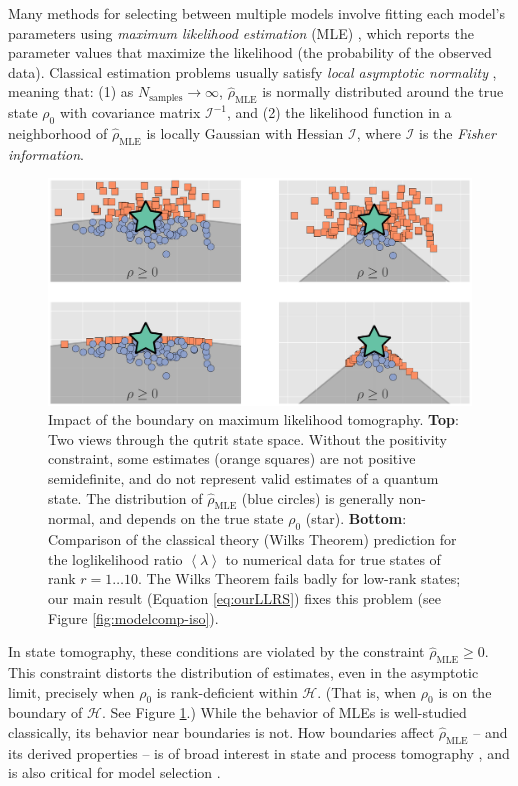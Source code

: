 \documentclass[aps,pra, twocolumn]{revtex4}
\newcommand{\cH}{\mathcal{H}}
\newcommand{\expect}[1]{\ensuremath{\left\langle#1\right\rangle}}
\newcommand{\Fi}{\mathcal{I}}
\newcommand{\rhohat}{\hat{\rho}}
\newcommand{\rhoMLE}{\rhohat_{\scriptscriptstyle\mathrm{MLE}}}
\begin{document}
Many methods for selecting between multiple models involve fitting each model's parameters using \emph{maximum likelihood estimation} (MLE) \cite{Hradil1997, JamesPRA2001, Blume-Kohout2010}, which reports the parameter values that maximize the likelihood (the probability of the observed data). Classical estimation problems usually satisfy \emph{local asymptotic normality} \cite{LeCam1970, LeCam1956}, meaning that: (1) as $N_{\mathrm{samples}}\rightarrow \infty$,  $\rhoMLE$ is normally distributed around the true state $\rho_{0}$ with covariance matrix $\Fi^{-1}$, and (2) the likelihood function in a neighborhood of $\rhoMLE$ is locally Gaussian with Hessian $\Fi$, where $\Fi$ is the \emph{Fisher information}.

\begin{figure}[h]
\includegraphics[width=\columnwidth]{Images/Figure_1.pdf}
 \caption{Impact of the boundary on maximum likelihood tomography. \textbf{Top}: Two views through the qutrit state space. Without the positivity constraint, some estimates (orange squares) are not positive semidefinite, and do not represent valid estimates of a quantum state. The distribution of $\rhoMLE$ (blue circles) is generally non-normal, and depends on the true state $\rho_{0}$ (star).
\textbf{Bottom}:  Comparison of the classical theory (Wilks Theorem) prediction for the loglikelihood ratio $\expect{\lambda}$ to numerical data for true states of rank $r=1\ldots 10$.  The Wilks Theorem fails badly for low-rank states; our main result (Equation \ref{eq:ourLLRS}) fixes this problem (see Figure \ref{fig:modelcomp-iso}).}
\label{fig:boundaries}
\end{figure}

In state tomography, these conditions are violated by the constraint $\rhoMLE \geq 0$. This constraint distorts the distribution of estimates, even in the asymptotic limit, precisely when $\rho_{0}$ is rank-deficient within $\cH$. (That is, when $\rho_{0}$ is on the boundary of $\cH$. See Figure \ref{fig:boundaries}.) While the behavior of MLEs is well-studied classically, its behavior near boundaries is not.  How boundaries affect $\rhoMLE$ -- and its derived properties -- is of broad interest in state and process tomography  \cite{Candes2006, Flammia2012a}, and is also critical for model selection \cite{Schwarz2013a, Guta2012a, VanEnk2013a, Yin2011, Moroder2013}.
\end{document}
